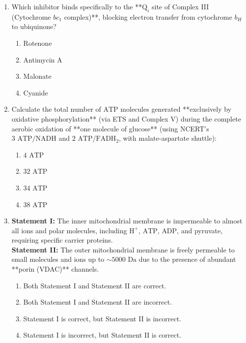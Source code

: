 \documentclass[11pt, a4paper]{article}
\begin{document}
\begin{enumerate}[label=\textbf{\arabic*.}]
\item Which inhibitor binds specifically to the **$\text{Q}_i$ site of Complex III (Cytochrome $bc_1$ complex)**, blocking electron transfer from cytochrome $b_H$ to ubiquinone?
\begin{enumerate}[label=(\Alph*)]
    \item Rotenone
    \item Antimycin A
    \item Malonate
    \item Cyanide
\end{enumerate}

\item Calculate the total number of $\text{ATP}$ molecules generated **exclusively by oxidative phosphorylation** (via ETS and Complex V) during the complete aerobic oxidation of **one molecule of glucose** (using NCERT's $3\text{ ATP}/\text{NADH}$ and $2\text{ ATP}/\text{FADH}_2$, with malate-aspartate shuttle):
\begin{enumerate}[label=(\Alph*)]
    \item $4\text{ ATP}$
    \item $32\text{ ATP}$
    \item $34\text{ ATP}$
    \item $38\text{ ATP}$
\end{enumerate}

\item \textbf{Statement I:} The inner mitochondrial membrane is impermeable to almost all ions and polar molecules, including $\text{H}^+$, $\text{ATP}$, $\text{ADP}$, and pyruvate, requiring specific carrier proteins. \\
\textbf{Statement II:} The outer mitochondrial membrane is freely permeable to small molecules and ions up to $\sim 5000\text{ Da}$ due to the presence of abundant **porin (VDAC)** channels.
\begin{enumerate}[label=(\Alph*)]
    \item Both Statement I and Statement II are correct.
    \item Both Statement I and Statement II are incorrect.
    \item Statement I is correct, but Statement II is incorrect.
    \item Statement I is incorrect, but Statement II is correct.
\end{enumerate}


\end{enumerate}
\end{document}
